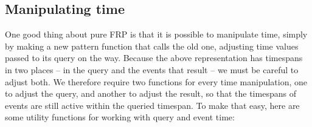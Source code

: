 \begin{Shaded}
\begin{Highlighting}[]
  \OtherTok{{-}\textgreater{}} 
\OtherTok{=} \NormalTok{ (} \NormalTok{)}
\OtherTok{=}\NormalTok{ (} \OperatorTok{+}\NormalTok{) }

  \OtherTok{{-}\textgreater{}}\NormalTok{ [}\NormalTok{]}
\OperatorTok{|}\OperatorTok{==}\OperatorTok{||}\OperatorTok{==}\OtherTok{=}\NormalTok{ [}\NormalTok{ s e]}
                         \OperatorTok{|}  \OtherTok{=} \OperatorTok{:}
    \OtherTok{=}

\OtherTok{{-}\textgreater{}} 
\OtherTok{=}  \OperatorTok{$} \OtherTok{{-}\textgreater{}} \NormalTok{ (} \OperatorTok{$} \OperatorTok{$}\OperatorTok{$}
\end{Highlighting}
\end{Shaded}

\subsection{Manipulating time}\label{manipulating-time}

One good thing about pure FRP is that it is possible to manipulate time,
simply by making a new pattern function that calls the old one,
adjusting time values passed to its query on the way. Because the above
representation has timespans in two places -- in the query and the
events that result -- we must be careful to adjust both. We therefore
require two functions for every time manipulation, one to adjust the
query, and another to adjust the result, so that the timespans of events
are still active within the queried timespan. To make that easy, here
are some utility functions for working with query and event time:

